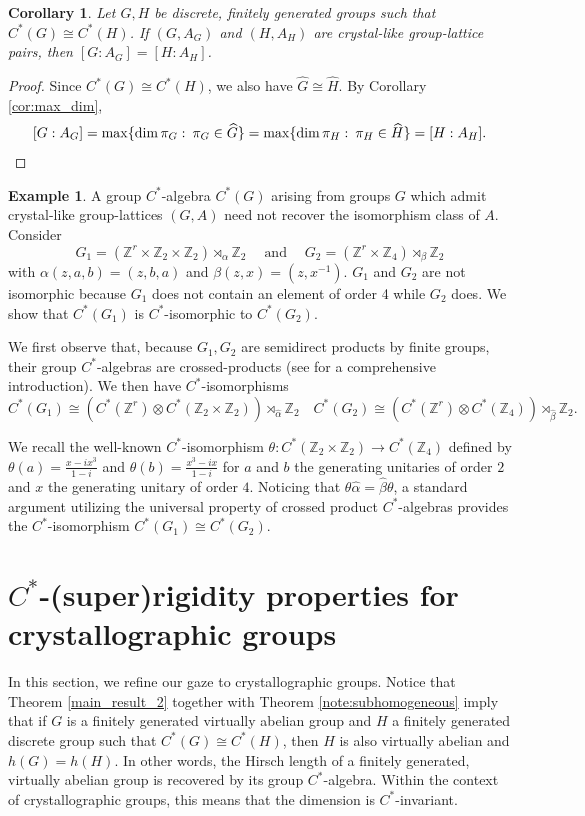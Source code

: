 \documentclass[11pt, twoside]{amsart}
\newcommand{\te}[1]{\operatorname{#1}}
\newcommand{\zn}{\mathbb{Z}}
\newcommand{\wh}{\widehat}
\newtheorem{cor}[thm]{Corollary}
\theoremstyle{definition}
\newtheorem{ex}[thm]{Example}
\newcommand{\B}{\mathbb}
\newcommand{\Z}{\B{Z}}
\begin{document}
\begin{cor}\label{crystal_like_order_of_point_group}
 Let $G,H$ be discrete, finitely generated groups such that $C^*(G)\cong C^*(H)$. If $(G,A_G)$ and $(H,A_H)$ are crystal-like group-lattice pairs, then $[G:A_G]=[H:A_H]$.
 \end{cor}

 \begin{proof}
Since $C^*(G)\cong C^*(H)$, we also have $\wh{G}\cong \wh{H}$. By Corollary \ref{cor:max_dim}, 
\[[G:A_G]=\max\{\dim\pi_G\,\colon\, \pi_G\in \widehat{G}\}=\max\{\dim\pi_H\,\colon\, \pi_H\in \widehat{H}\}=[H:A_H].\qedhere\]
 \end{proof}

\begin{ex}
A group $C^*$-algebra $C^*(G)$ arising from groups $G$ which admit crystal-like group-lattices $(G,A)$ need not recover the isomorphism class of $A$. Consider 
\[G_1=(\Z^r\times\zn_2\times\zn_2)\rtimes_{\alpha}\zn_2 \quad\te{ and }\quad G_2=(\Z^r\times\zn_4)\rtimes_{\beta}\zn_2\]
with $\alpha(z,a,b)=(z,b,a)$ and $\beta(z,x)=(z,x^{-1})$. $G_1$ and $G_2$ are not isomorphic because $G_1$ does not contain an element of order 4 while $G_2$ does. We show that $C^*(G_1)$ is $C^*$-isomorphic to $C^*(G_2)$.

We first observe that, because $G_1,G_2$ are semidirect products by finite groups, their group $C^*$-algebras are crossed-products (see \cite{phi17} for a comprehensive introduction). We then have $C^*$-isomorphisms
\[C^*(G_1)\cong \left( C^*(\Z^r)\otimes C^*(\Z_2\times\Z_2)\right)\rtimes_{\hat{\alpha}} \Z_2\quad C^*(G_2)\cong \left( C^*(\Z^r)\otimes C^*(\Z_4)\right)\rtimes_{\hat{\beta}} \Z_2. \]

We recall the well-known $C^*$-isomorphism $\theta:C^*(\Z_2\times \Z_2)\to C^*(\Z_4)$ defined by $\theta(a)= \frac{x-ix^3}{1-i}$ and $\theta(b)=\frac{x^3-ix}{1-i}$ for $a$ and $b$ the generating unitaries of order $2$ and $x$ the generating unitary of order $4$. Noticing that $\theta \hat \alpha=\hat \beta \theta$, a standard argument utilizing the universal property of crossed product $C^*$-algebras provides the $C^*$-isomorphism $C^*(G_1)\cong C^*(G_2)$.
\end{ex}

\section{$C^*$-(super)rigidity properties for crystallographic groups}
 
 In this section, we refine our gaze to crystallographic groups. Notice that Theorem \ref{main_result_2} together with Theorem \ref{note:subhomogeneous} imply that if $G$ is a finitely generated virtually abelian group and $H$ a finitely generated discrete group such that $C^*(G)\cong C^*(H)$, then $H$ is also virtually abelian and $h(G)=h(H)$. In other words, the Hirsch length of a finitely generated, virtually abelian group is recovered by its group $C^*$-algebra. Within the context of crystallographic groups, this means that the dimension is $C^*$-invariant.
 
\end{document}
